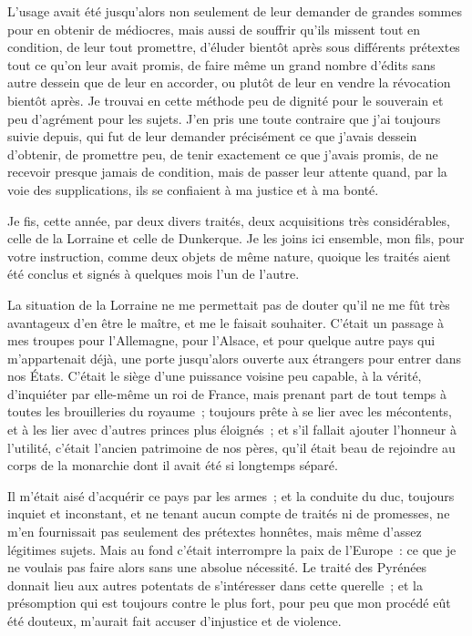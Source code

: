 \documentclass[french,twoside]{book} %
\begin{document}
L’usage avait été jusqu’alors non seulement de leur demander de grandes sommes pour en obtenir de médiocres, mais aussi de souffrir qu’ils missent tout en condition, de leur tout promettre, d’éluder bientôt après sous différents prétextes tout ce qu’on leur avait promis, de faire même un grand nombre d’édits sans autre dessein que de leur en accorder, ou plutôt de leur en vendre la révocation bientôt après. Je trouvai en cette méthode peu de dignité pour le souverain et peu d’agrément pour les sujets. J’en pris une toute contraire que j’ai toujours suivie depuis, qui fut de leur demander précisément ce que j’avais dessein d’obtenir, de promettre peu, de tenir exactement ce que j’avais promis, de ne recevoir presque jamais de condition, mais de passer leur attente quand, par la voie des supplications, ils se confiaient à ma justice et à ma bonté.\par
Je fis, cette année, par deux divers traités, deux acquisitions très considérables, celle de la Lorraine et celle de Dunkerque. Je les joins ici ensemble, mon fils, pour votre instruction, comme deux objets de même nature, quoique les traités aient été conclus et signés à quelques mois l’un de l’autre.\par
La situation de la Lorraine ne me permettait pas de douter qu’il ne me fût très avantageux d’en être le maître, et me le faisait souhaiter. C’était un passage à mes troupes pour l’Allemagne, pour l’Alsace, et pour quelque autre pays qui m’appartenait déjà, une porte jusqu’alors ouverte aux étrangers pour entrer dans nos États. C’était le siège d’une puissance voisine peu capable, à la vérité, d’inquiéter par elle-même un roi de France, mais prenant part de tout temps à toutes les brouilleries du royaume ; toujours prête à se lier avec les mécontents, et à les lier avec d’autres princes plus éloignés ; et s’il fallait ajouter l’honneur à l’utilité, c’était l’ancien patrimoine de nos pères, qu’il était beau de rejoindre au corps de la monarchie dont il avait été si longtemps séparé.\par
Il m’était aisé d’acquérir ce pays par les armes ; et la conduite du duc, toujours inquiet et inconstant, et ne tenant aucun compte de traités ni de promesses, ne m’en fournissait pas seulement des prétextes honnêtes, mais même d’assez légitimes sujets. Mais au fond c’était interrompre la paix de l’Europe : ce que je ne voulais pas faire alors sans une absolue nécessité. Le traité des Pyrénées donnait lieu aux autres potentats de s’intéresser dans cette querelle ; et la présomption qui est toujours contre le plus fort, pour peu que mon procédé eût été douteux, m’aurait fait accuser d’injustice et de violence.\par
\end{document}
